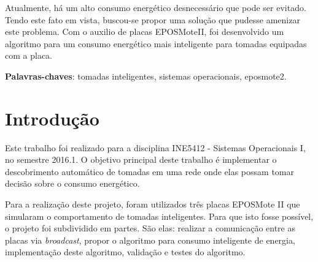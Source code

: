 \documentclass[article,11pt,oneside,a4paper,english,brazil]{abntex2}
\begin{document}
\frenchspacing 


%
%
\maketitle

\begin{resumoumacoluna}
	Atualmente, há um alto consumo energético desnecessário que pode ser evitado. Tendo este fato em vista, buscou-se propor uma solução que pudesse amenizar este problema. Com o auxilio de placas EPOSMoteII, foi desenvolvido um algoritmo para um consumo energético mais inteligente para tomadas equipadas com a placa.  
	
	\vspace{\onelineskip}
	
	\noindent
	\textbf{Palavras-chaves}: tomadas inteligentes, sistemas operacionais, eposmote2.
\end{resumoumacoluna}


\textual

\section{Introdução}

	Este trabalho foi realizado para a disciplina INE5412 - Sistemas Operacionais I, no semestre 2016.1. O objetivo principal deste trabalho é implementar o descobrimento automático de tomadas em uma rede onde elas possam tomar decisão sobre o consumo energético.
	
	Para a realização deste projeto, foram utilizados três placas EPOSMote II \cite{eposproject} que simularam o comportamento de tomadas inteligentes. Para que isto fosse possível, o projeto foi subdividido em partes. São elas: realizar a comunicação entre as placas via \textit{broadcast}, propor o algoritmo para consumo inteligente de energia, implementação deste algoritmo, validação e testes do algoritmo.
	
\end{document}
